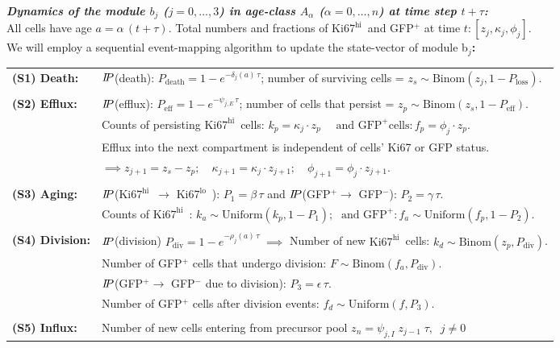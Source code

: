 \documentclass[11pt]{article}
\newcommand{\khi}{\ensuremath{\text{Ki67}^\text{hi}}~}
\newcommand{\klo}{\ensuremath{\text{Ki67}^\text{lo}}~}
\newcommand\prob{$I\kern-0.25em P$}
\begin{document}
\begin{mybox}
\textbf{\textit{Dynamics of the module $b_j$ ($j = 0,\ldots,3$) in age-class $A_\alpha$ ($\alpha = 0,\ldots,n$) at time step $t+\tau$:}} \\

\vspace{-3mm}
All cells have age $a= \alpha\, (t+\tau)$. 
Total numbers and fractions of \khi and GFP$^+$ at time $t: [z_j, \kappa_j, \phi_j]$. \\
We will employ a sequential event-mapping algorithm to update the state-vector of module b$_j$\textbf{:}

\begin{tabular}{ll}
    \textbf{(S1) Death:}  &\prob(death): $P_\text{death}= 1 - e^{-\delta_{j}(a) \, \tau}$; number of surviving cells =  $z_{s} \sim \text{Binom}(z_j, 1-P_\text{loss})$. \\
    \\
    \textbf{(S2) Efflux:} &\prob(efflux): $P_\text{eff}= 1 - e^{-\psi_{j, E} \, \tau}$; \; number of cells that persist =  $z_{p} \sim \text{Binom}(z_s, 1- P_\text{eff})$. \\
    & Counts of persisting \khi cells: $k_p = \kappa_j \cdot z_p \quad \text{ and GFP}^+ \text{cells}: f_p = \phi_j \cdot z_p$.\\
    & Efflux into the next compartment is independent of cells' Ki67 or GFP status. \\
    & $\implies z_{j+1} = z_{s} - z_{p}; \quad \kappa_{j+1} = \kappa_j  \cdot z_{j+1}; \quad \phi_{j+1} = \phi_j \cdot z_{j+1}.$\\
    \\
    \textbf{(S3) Aging:}  & \prob(\khi $\rightarrow$ \klo): $P_1 = \beta \, \tau$  and  \prob(GFP$^+ \rightarrow$ GFP$^-$):  $P_2 = \gamma \, \tau$. \\     &Counts of \khi:  $k_{a} \sim \text{Uniform}(k_p,  1-P_{1}); \; \text{ and GFP}^+:  f_{a} \sim \text{Uniform}(f_p,  1-P_{2})$.\\
    \\
    \textbf{(S4) Division:}  &\prob(division) $P_\text{div}= 1 - e^{-\rho_{j}(a) \, \tau} \; \implies$
    Number of new \khi cells: $k_{d} \sim \text{Binom}(z_{p} , P_\text{div})$. \\
    &Number of GFP$^+$ cells that undergo division: $F \sim \text{Binom}(f_{a}, P_\text{div})$. \\
    &\prob(GFP$^+ \rightarrow$ GFP$^-$ due to division): $P_3 = \epsilon \, \tau$.\\
    &Number of GFP$^+$ cells after division events: $f_{d} \sim \text{Uniform}(f,  P_3)$.\\ 
    \\
    \textbf{(S5) Influx:}  &Number of new cells entering from precursor pool $z_{n} =  \psi_{j, I} \; z_{j-1} \; \tau,  \;\; j\neq0$ \\
\end{tabular}


\end{mybox}
\end{document}

